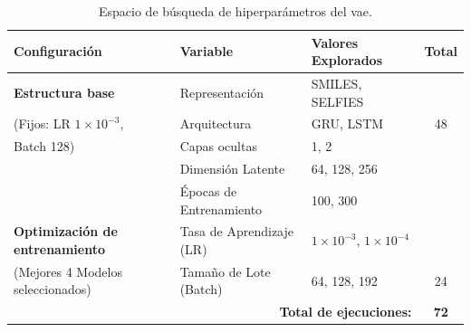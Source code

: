 \begin{table}[htbp]
\centering
\caption{Espacio de búsqueda de hiperparámetros del \acrshort{vae}.}
\label{tab:espacio_busqueda_vae}
\begin{tabular}{lllc}
\toprule
\textbf{Configuración} & \textbf{Variable} & \textbf{Valores Explorados} & \textbf{Total} \\
\midrule
\textbf{Estructura base} & Representación & SMILES, SELFIES & \\
(Fijos: LR $1 \times 10^{-3}$, & Arquitectura & GRU, LSTM & 48 \\
Batch 128) & Capas ocultas & 1, 2 & \\
 & Dimensión Latente & 64, 128, 256 & \\
 & Épocas de Entrenamiento & 100, 300 & \\
\midrule
\textbf{Optimización de entrenamiento} & Tasa de Aprendizaje (LR) & $1 \times 10^{-3}$, $1 \times 10^{-4}$ & \\
(Mejores 4 Modelos seleccionados) & Tamaño de Lote (Batch) & 64, 128, 192 & 24 \\
\midrule
\multicolumn{3}{r}{\textbf{Total de ejecuciones:}} & \textbf{72} \\
\bottomrule
\end{tabular}
\end{table}
